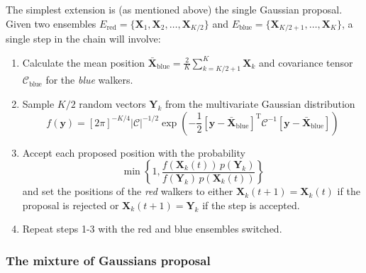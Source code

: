 \documentclass[12pt,preprint]{aastex}
\newcommand{\eqlabel}[1]{\label{eq:#1}}
\begin{document}
The simplest extension is (as mentioned above) the single Gaussian proposal. Given
two ensembles $E_\mathrm{red} = \{ \mathbf{X}_1, \mathbf{X}_2, \ldots, \mathbf{X}_{K/2} \}$
and $E_\mathrm{blue} = \{ \mathbf{X}_{K/2+1}, \ldots, \mathbf{X}_{K} \}$, a single step
in the chain will involve:
\begin{enumerate}
    \item{
        Calculate the mean position $\bar{\mathbf{X}}_\mathrm{blue} = \frac{2}{K}\sum_{k=K/2+1} ^K \mathbf{X}_k$
        and covariance tensor $\mathcal{C}_\mathrm{blue}$ for the \emph{blue} walkers.
        }
    \item{
        Sample $K/2$ random vectors $\mathbf{Y}_k$ from the multivariate Gaussian distribution
        \begin{equation}
            \eqlabel{singlegaussprop}
            f(\mathbf{y}) = [2 \pi]^{-K/4} \left | \mathcal{C} \right |^{-1/2}
            \exp \left ( -\frac{1}{2} [\mathbf{y} - \bar{\mathbf{X}}_\mathrm{blue}]^\mathrm{T}
            \mathcal{C}^{-1} [\mathbf{y} - \bar{\mathbf{X}}_\mathrm{blue}] \right )
        \end{equation}
        }
    \item{
        Accept each proposed position with the probability
        \begin{equation}
            \eqlabel{singlegaussaccept}
            \min \left \{ 1, \frac{f(\mathbf{X}_k(t)) \, p(\mathbf{Y}_k)}{f(\mathbf{Y}_k) \, p(\mathbf{X}_k(t))} \right \}
        \end{equation}
        and set the positions of the \emph{red} walkers to either $\mathbf{X}_k (t+1) = \mathbf{X}_k(t)$
        if the proposal is rejected
        or $\mathbf{X}_k (t+1) = \mathbf{Y}_k$ if the step is accepted.
        }
    \item{
        Repeat steps 1-3 with the red and blue ensembles switched.
        }
\end{enumerate}

\subsubsection{The mixture of Gaussians proposal}
\end{document}
